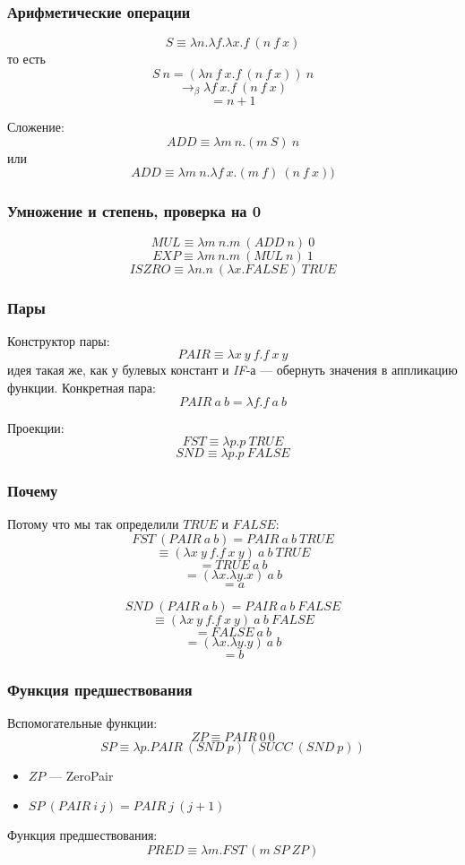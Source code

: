 \documentclass{../../slides-style}
\begin{document}
    \begin{frame}
        \frametitle{Арифметические операции}
        $$S \equiv \lambda n.\lambda f.\lambda x.f\ (n\ f\ x)$$
        то есть
        $$S\ n = (\lambda n\ f\ x.f\ (n\ f\ x))\ n$$
        $$\rightarrow_\beta \lambda f\ x.f\ (n\ f\ x)$$
        $$= n + 1$$
        
        Сложение:
        $$ADD \equiv \lambda m\ n.(m\ S)\ n$$
        или
        $$ADD \equiv \lambda m\ n.\lambda f\ x.(m\ f)\ (n\ f\ x))$$
    \end{frame}

    \begin{frame}
        \frametitle{Умножение и степень, проверка на 0}
        $$MUL \equiv \lambda m\ n.m\ (ADD\ n)\ 0$$
        $$EXP \equiv \lambda m\ n.m\ (MUL\ n)\ 1$$
        $$ISZRO \equiv \lambda n.n\ (\lambda x.FALSE)\ TRUE$$
    \end{frame}

    \begin{frame}
        \frametitle{Пары}
        Конструктор пары:
        $$PAIR \equiv \lambda x\ y\ f.f\ x\ y$$
        идея такая же, как у булевых констант и \textit{IF}-а --- обернуть значения в аппликацию функции. Конкретная пара:
        $$PAIR\ a\ b = \lambda f.f\ a\ b$$
        
        Проекции:
        $$FST \equiv \lambda p.p\ TRUE$$
        $$SND \equiv \lambda p.p\ FALSE$$
    \end{frame}

    \begin{frame}
        \frametitle{Почему}
        Потому что мы так определили $TRUE$ и $FALSE$:
        $$FST\ (PAIR\ a\ b) = PAIR\ a\ b\ TRUE$$
        $$\equiv (\lambda x\ y\ f.f\ x\ y)\ a\ b\ TRUE$$
        $$= TRUE\ a\ b$$
        $$= (\lambda x.\lambda y.x)\ a\ b$$
        $$= a$$

        $$SND\ (PAIR\ a\ b) = PAIR\ a\ b\ FALSE$$
        $$\equiv (\lambda x\ y\ f.f\ x\ y)\ a\ b\ FALSE$$
        $$= FALSE\ a\ b$$
        $$= (\lambda x.\lambda y.y)\ a\ b$$
        $$= b$$
    \end{frame}

    \begin{frame}
        \frametitle{Функция предшествования}
        Вспомогательные функции:
        $$ZP \equiv PAIR\ 0\ 0$$
        $$SP \equiv \lambda p.PAIR\ (SND\ p)\ (SUCC\ (SND\ p))$$
        \begin{itemize}
            \item $ZP$ --- ZeroPair
            \item $SP\ (PAIR\ i\ j) = PAIR\ j\ (j + 1)$
        \end{itemize}

        \vspace{3mm}

        Функция предшествования:
        $$PRED \equiv \lambda m.FST\ (m\ SP\ ZP)$$
    \end{frame}
\end{document}
